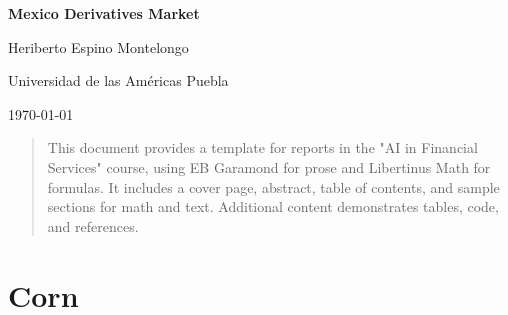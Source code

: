 \documentclass[10pt,a4paper]{article} %
\begin{document}
\begin{titlepage}
  \centering
  \vspace*{4cm}
  {\Huge\bfseries Mexico Derivatives Market\par}
  \vspace{2cm}
  {\Large Heriberto Espino Montelongo\par}
  \vspace{1cm}
  {\large Universidad de las Américas Puebla\par}
  \vfill
  {\large \today\par}
\end{titlepage}

\begin{abstract}
This document provides a template for reports in the "AI in Financial Services" course, using EB Garamond for prose and Libertinus Math for formulas. It includes a cover page, abstract, table of contents, and sample sections for math and text. Additional content demonstrates tables, code, and references.
\end{abstract}

\tableofcontents
\thispagestyle{empty}
\newpage


\section{Corn}
\end{document}
